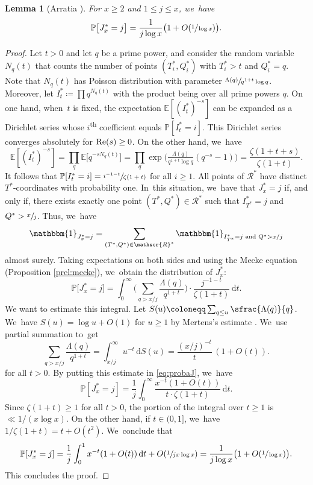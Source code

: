 \documentclass[10pt]{amsart}
\newcommand{\PP}{\mathbb{P}}
\newcommand{\EE}{\mathbb{E}}
\newcommand{\one}{\mathbbm{1}}
\newcommand{\RS}{\mathscr{R}}
\newcommand{\bigoo}[1]{O\!\left(#1 \right)}
\newcommand{\riemint}[4]{\int_{#1}^{#2}\! #3 \, \mathrm{d}#4}
\renewcommand{\Re}{\textup{Re}}
\newcommand{\bg}{\big}
\newcommand{\bgg}{\Big}
\theoremstyle{plain}
\newtheorem{lem}[cor]{Lemma}
\theoremstyle{definition}
\begin{document}
\begin{lem}[Arratia \cite{Arratia02}]
\label{lem:probaj}
For $x \ge 2$ and $1 \le j \le x$, we~have
\[
\PP\bg[J_x^*=j\bg] = \frac{1}{j\log x}\bigl(1+\bigoo{\sfrac{1}{\log x}} \bigr).
\]
\end{lem}

\begin{proof}
Let $t>0$ and let $q$ be a prime power, and consider the random variable $N_q(t)$ that counts the number of points $(T^*_i, Q^*_i)$ with $T^*_i > t$ and $Q^*_i = q$. Note that $N_q(t)$ has Poisson distribution with parameter $\sfrac{\Lambda(q)}{q^{1+t}\log q}$. Moreover, let $I^*_t \coloneqq \prod q^{N_q(t)}$ with the product being over all prime powers $q$. On one hand, when~$t$ is fixed, the expectation $\EE[(I^*_t)^{-s}]$ can be expanded as a Dirichlet series whose $i$\textsuperscript{th} coefficient equals $\PP[I^*_t = i]$. This Dirichlet series converges absolutely for $\Re(s)\ge0$. On the other hand, we~have
\[
\EE[(I^*_t)^{-s}] = \prod_q \EE\bg[q^{-sN_q(t)}\bg] = \prod_q \exp\!\bgg(\tfrac{\Lambda(q)}{q^{1+t}\log q} (q^{-s}-1)\bgg) = \frac{\zeta(1+t+s)}{\zeta(1+t)}.
\]
It follows that $\PP[I^*_t = i] = \sfrac{i^{-1-t}}{\zeta(1+t)}$ for all $i \ge 1$. All points of $\RS^*$ have distinct $T^*$-coordinates with probability one. In~this situation, we~have that $J_x^* = j$ if, and only if, there exists exactly one point $(T^*, Q^*) \in \RS^*$ such that $I^*_{T^*} = j$ and $Q^* > \sfrac{x}{j}$. Thus, we~have
\[
\one _{J_x^* = j} = \sum_{(T^*, Q^*) \in \RS^*} \one _{I^*_{T^*} = j \text{ and } Q^{*}> x/j}
\]
almost surely. Taking expectations on both sides and using the Mecke equation (Proposition \ref{prel:mecke}), we~obtain the distribution of $J_x^*$:
\begin{equation}
\label{eq:probaJ}
\PP\bg[J_x^*=j\bg]
= \riemint{0}{\infty}{\bigg(\sum_{q > x/j} \frac{\Lambda(q)}{q^{1+t}}\bigg)\cdot \frac{j^{-1-t}}{\zeta(1+t)}}{t}.
\end{equation}
We want to estimate this integral. Let $S(u) \coloneqq \sum_{q \le u} \sfrac{\Lambda(q)}{q}$. We~have $S(u) = \log u + O(1)$ for $u \ge 1$ by Mertens's estimate \cite[Th.\,3.4(a)]{Koukoulo19}. We~use partial summation to~get
\[
\sum_{q > x/j} \frac{\Lambda(q)}{q^{1+t}} = \riemint{x/j}{\infty}{u^{-t}}{S(u)} = \frac{(x/j)^{-t}}{t}\,(1+O(t)).
\]
for all $t > 0$. By putting this estimate in \eqref{eq:probaJ}, we~have
\[
\PP[J_x^* = j] = \frac{1}{j} \riemint{0}{\infty}{\frac{x^{-t}(1+O(t))}{t\cdot \zeta(1+t)}}{t}.
\]
Since $\zeta(1+t)\ge1$ for all $t>0$, the portion of the integral over $t\ge1$ is $\ll 1/(x\log x)$. On the other hand, if $t\in(0,1]$, we~have $1/\zeta(1+t)=t+O(t^2)$. We~conclude that
\[
\PP[J_x^* = j] = \frac{1}{j} \int_0^1 x^{-t}(1+O(t)) \,\mathrm dt + O(\sfrac{1}{jx\log x}) = \frac{1}{j\log x}\bg(1+O(\sfrac{1}{\log x})\bg).
\]
This concludes the proof.
\end{proof}
\end{document}
